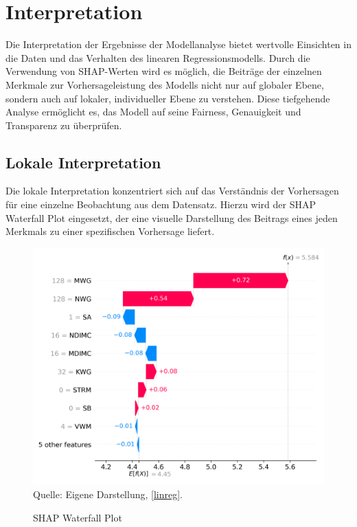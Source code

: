 \section{Interpretation}

Die Interpretation der Ergebnisse der Modellanalyse bietet wertvolle Einsichten in die Daten 
und das Verhalten des linearen Regressionsmodells. Durch die Verwendung von SHAP-Werten wird 
es möglich, die Beiträge der einzelnen Merkmale zur Vorhersageleistung des Modells nicht nur 
auf globaler Ebene, sondern auch auf lokaler, individueller Ebene zu verstehen. 
Diese tiefgehende Analyse ermöglicht es, das Modell auf seine Fairness, 
Genauigkeit und Transparenz zu überprüfen.


\subsection{Lokale Interpretation}

Die lokale Interpretation konzentriert sich auf das Verständnis der Vorhersagen 
für eine einzelne Beobachtung aus dem Datensatz. Hierzu wird der SHAP Waterfall Plot eingesetzt, 
der eine visuelle Darstellung des Beitrags eines jeden Merkmals zu einer spezifischen Vorhersage liefert.

\begin{figure}[!h]
    \caption{SHAP Waterfall Plot}
    \includegraphics[width=1\textwidth]{../scripts/images/shap_waterfall_plot_gpu.png}
    Quelle: Eigene Darstellung, \ref{linreg}.
    \label{pic:shap_waterfall}
\end{figure}


